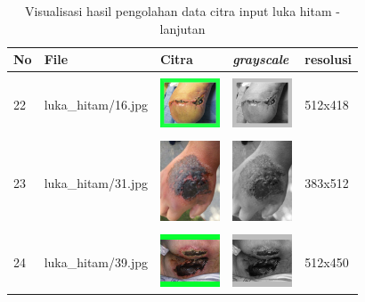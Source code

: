 \begin{table}[H]
	\centering
	\caption{Visualisasi hasil pengolahan data citra input luka hitam - lanjutan}
	\label{tabel_input_4}
	\begin{tabular}{|m{0.2in}|m{1.2in}|m{0.7in}|m{0.7in}|m{0.7in}|}
		\hline
		\textbf{No} & \textbf{File} & \textbf{Citra} & \textbf{\emph{grayscale}} & \textbf{resolusi} \\
		\hline
		
		& &  &  &\\
		22 & 
		luka\_hitam/16.jpg &
		\includegraphics[width=0.7in]{dataset/dataset_3/luka_hitam/ready/16.jpg}&
		\includegraphics[width=0.7in]{dataset/dataset_3/luka_hitam/ready/16_gray.jpg}&
		512x418\\
		\hline
		
		& &  &  &\\
		23 & 
		luka\_hitam/31.jpg &
		\includegraphics[width=0.7in]{dataset/dataset_3/luka_hitam/ready/31.jpg}&
		\includegraphics[width=0.7in]{dataset/dataset_3/luka_hitam/ready/31_gray.jpg}&
		383x512\\
		\hline
		
		& &  &  &\\
		24 & 
		luka\_hitam/39.jpg &
		\includegraphics[width=0.7in]{dataset/dataset_3/luka_hitam/ready/39.jpg}&
		\includegraphics[width=0.7in]{dataset/dataset_3/luka_hitam/ready/39_gray.jpg}&
		512x450\\
		\hline
	\end{tabular}
\end{table}


